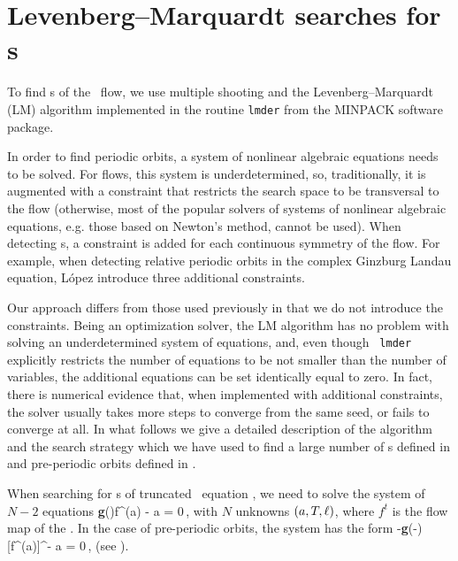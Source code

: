 
\section{Levenberg--Marquardt searches for \rpo s}
\label{sec:lmderRLD}

To find \rpo s of the \KS\ flow, we use multiple shooting and
the Levenberg--Marquardt (LM) algorithm implemented in the routine
{\tt lmder} from the MINPACK software package.

In order to find periodic orbits, a system of nonlinear
algebraic equations needs to be solved.  For flows, this
system is underdetermined, so, traditionally, it is augmented
with a constraint that restricts the search space to be
transversal to the flow (otherwise, most of the popular
solvers of systems of nonlinear algebraic equations, e.g.
those based on Newton's method, cannot be used). When
detecting \rpo s, a constraint is added for each continuous
symmetry of the flow.  For example, when detecting relative
periodic orbits in the complex Ginzburg Landau equation,
L{\'o}pez {\etal} introduce three additional
constraints.

Our approach differs from those used previously in that we do
not introduce the constraints.  Being an optimization solver,
the LM algorithm has no problem with solving an
underdetermined system of equations, and, even though {\tt
lmder} explicitly restricts the number of equations to be not
smaller than the number of variables, the additional
equations can be set identically equal to
zero.  In fact, there is numerical
evidence that, when implemented with additional constraints,
the solver usually takes more steps to converge from the same
seed, or fails to converge at all. In what
follows we give a detailed description of the algorithm and
the search strategy which we have used to find a large number
of \rpo s defined in  and pre-periodic orbits
defined in .

When searching for \rpo s of truncated \KS\ equation
, we need to solve the system of $N-2$ equations
\beq
  {\bf g}(\shift)f^\period{}(a) - a = 0\,,
with $N$ unknowns $(a, {T_{}}, \ell)$, where $f^t$
is the flow map of the \KSe.  In the case of pre-periodic orbits, the system has
the form
\beq
  -{\bf g}(-\shift)[f^\period{}(a)]^\ast - a = 0\,,
(see ).

